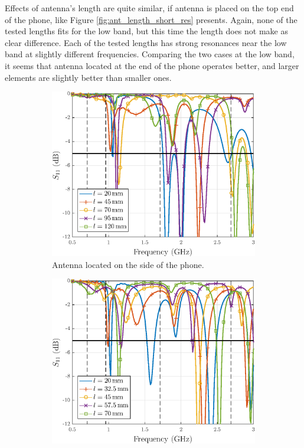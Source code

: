 Effects of antenna's length are quite similar, if antenna is placed on the top end of the phone, like Figure \ref{fig:ant_length_short_res} presents. Again, none of the tested lengths fits for the low band, but this time the length does not make as clear difference. Each of the tested lengths has strong resonances near the low band at slightly different frequencies. Comparing the two cases at the low band, it seems that antenna located at the end of the phone operates better, and larger elements are slightly better than smaller ones.

\begin{figure}[H]
    \centering
    \begin{subfigure}[b]{0.49\textwidth}
        \includegraphics[width=\textwidth]{img/ant_length_long_res.eps}
        \caption{Antenna located on the side of the phone.}
        \label{fig:ant_length_long_res}
    \end{subfigure}
    \begin{subfigure}[b]{0.49\textwidth}
        \includegraphics[width=\textwidth]{img/ant_length_short_res.eps}

\end{subfigure}
\end{figure}
